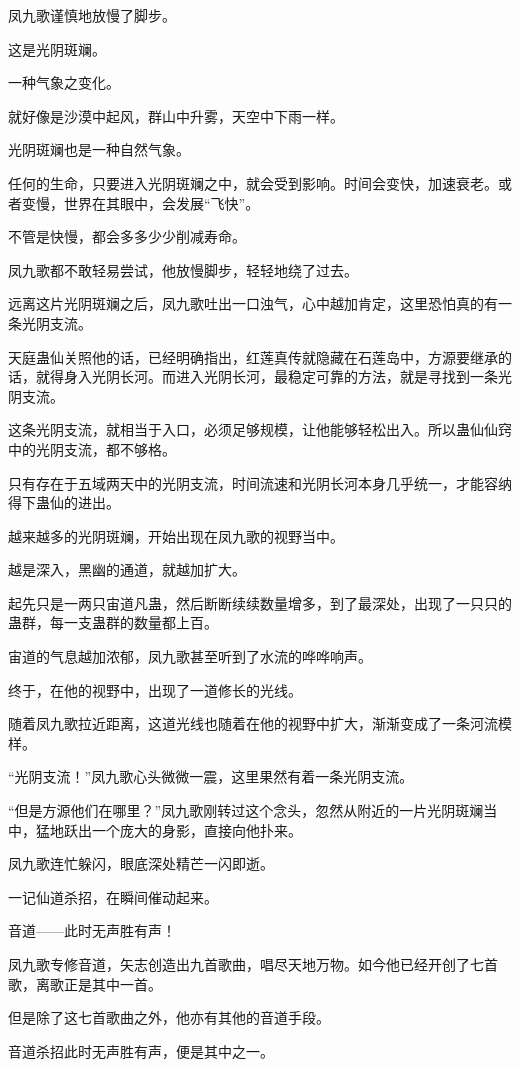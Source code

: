 \begin{this_body}
凤九歌谨慎地放慢了脚步。

这是光阴斑斓。

一种气象之变化。

就好像是沙漠中起风，群山中升雾，天空中下雨一样。

光阴斑斓也是一种自然气象。

任何的生命，只要进入光阴斑斓之中，就会受到影响。时间会变快，加速衰老。或者变慢，世界在其眼中，会发展“飞快”。

不管是快慢，都会多多少少削减寿命。

凤九歌都不敢轻易尝试，他放慢脚步，轻轻地绕了过去。

远离这片光阴斑斓之后，凤九歌吐出一口浊气，心中越加肯定，这里恐怕真的有一条光阴支流。

天庭蛊仙关照他的话，已经明确指出，红莲真传就隐藏在石莲岛中，方源要继承的话，就得身入光阴长河。而进入光阴长河，最稳定可靠的方法，就是寻找到一条光阴支流。

这条光阴支流，就相当于入口，必须足够规模，让他能够轻松出入。所以蛊仙仙窍中的光阴支流，都不够格。

只有存在于五域两天中的光阴支流，时间流速和光阴长河本身几乎统一，才能容纳得下蛊仙的进出。

越来越多的光阴斑斓，开始出现在凤九歌的视野当中。

越是深入，黑幽的通道，就越加扩大。

起先只是一两只宙道凡蛊，然后断断续续数量增多，到了最深处，出现了一只只的蛊群，每一支蛊群的数量都上百。

宙道的气息越加浓郁，凤九歌甚至听到了水流的哗哗响声。

终于，在他的视野中，出现了一道修长的光线。

随着凤九歌拉近距离，这道光线也随着在他的视野中扩大，渐渐变成了一条河流模样。

“光阴支流！”凤九歌心头微微一震，这里果然有着一条光阴支流。

“但是方源他们在哪里？”凤九歌刚转过这个念头，忽然从附近的一片光阴斑斓当中，猛地跃出一个庞大的身影，直接向他扑来。

凤九歌连忙躲闪，眼底深处精芒一闪即逝。

一记仙道杀招，在瞬间催动起来。

音道——此时无声胜有声！

凤九歌专修音道，矢志创造出九首歌曲，唱尽天地万物。如今他已经开创了七首歌，离歌正是其中一首。

但是除了这七首歌曲之外，他亦有其他的音道手段。

音道杀招此时无声胜有声，便是其中之一。


\end{this_body}
